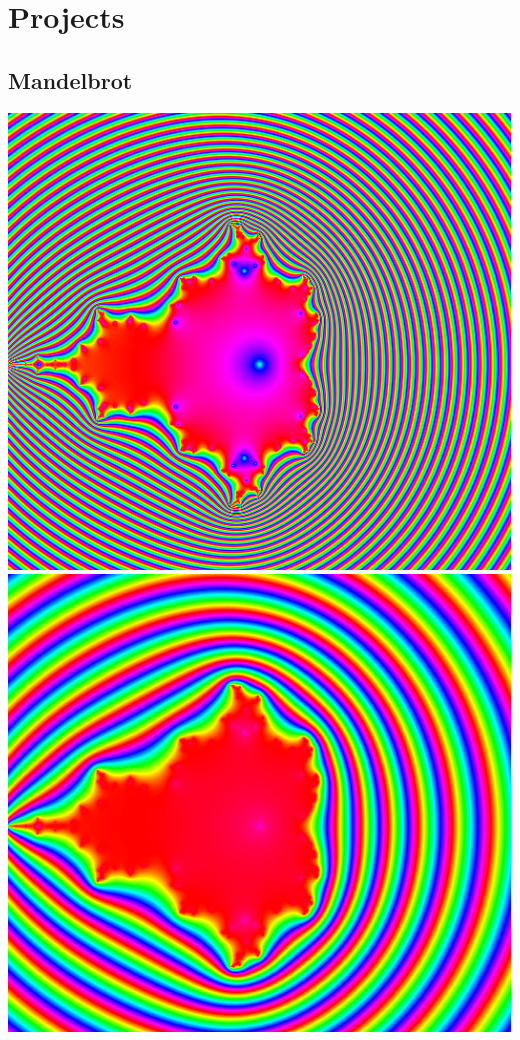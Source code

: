 \documentclass[../r.tex]{subfiles}
\begin{document}
\section{Projects}

\subsection{Mandelbrot}

\noindent
\includegraphics[scale=0.15]{../TAing/mandel/1.png} 
\includegraphics[scale=0.15]{../TAing/mandel/2.png}
\end{document}
